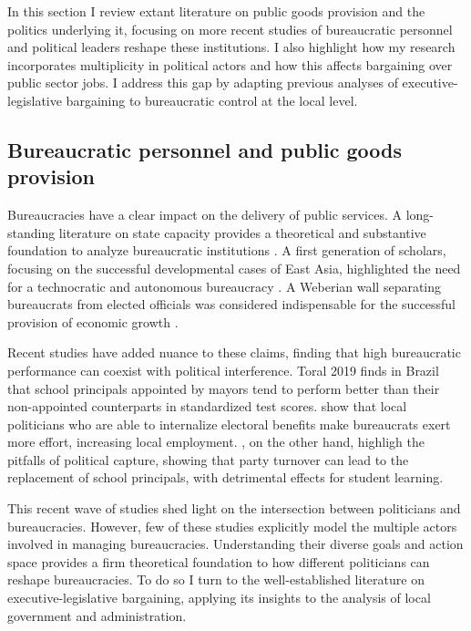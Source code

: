 \documentclass[12pt,a4paper]{article}
\begin{document}
In this section I review extant literature on public goods provision and the politics underlying it, focusing on more recent studies of bureaucratic personnel and political leaders reshape these institutions. I also highlight how my research incorporates multiplicity in political actors and how this affects bargaining over public sector jobs. I address this gap by adapting previous analyses of executive-legislative bargaining to bureaucratic control at the local level.

\subsection*{Bureaucratic personnel and public goods provision}

Bureaucracies have a clear impact on the delivery of public services. A long-standing literature on state capacity provides a theoretical and substantive foundation to analyze bureaucratic institutions \citep{centeno_unpacking_2017, kohli_state-directed_2004}. A first generation of scholars, focusing on the successful developmental cases of East Asia, highlighted the need for a technocratic and autonomous bureaucracy \citep{johnson_miti_1982, kohli_state-directed_2004}. A Weberian wall separating bureaucrats from elected officials was considered indispensable for the successful provision of economic growth \citep{evans_bureaucracy_1999}.

Recent studies have added nuance to these claims, finding that high bureaucratic performance can coexist with political interference. Toral 2019 finds in Brazil that school principals appointed by mayors tend to perform better than their non-appointed counterparts in standardized test scores. \citet{gulzar_politicians_2017} show that local politicians who are able to internalize electoral benefits make bureaucrats exert more effort, increasing local employment. \citet{akhtari_political_2015}, on the other hand, highligh the pitfalls of political capture, showing that party turnover can lead to the replacement of school principals, with detrimental effects for student learning.

This recent wave of studies shed light on the intersection between politicians and bureaucracies. However, few of these studies explicitly model the multiple actors involved in managing bureaucracies. Understanding their diverse goals and action space provides a firm theoretical foundation to how different politicians can reshape bureaucracies. To do so I turn to the well-established literature on executive-legislative bargaining, applying its insights to the analysis of local government and administration.
\end{document}
